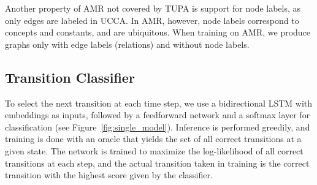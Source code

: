 \documentclass[11pt,a4paper]{article}
\begin{document}
Another property of AMR not covered by TUPA is support for node labels, 
as only edges are labeled in UCCA. In AMR, however, node labels correspond 
to concepts and constants, and are ubiquitous.
When training on AMR, we produce graphs only with edge labels (relations) 
and without node labels.


\subsection{Transition Classifier}\label{sec:classifier}

To select the next transition at each time step,
we use a bidirectional LSTM with embeddings as inputs,
followed by a feedforward network and a softmax layer for classification 
(see Figure~\ref{fig:single_model}).
Inference is performed greedily,
and training is done with an oracle that yields the set of all correct 
transitions at a given state.
The network is trained to maximize the log-likelihood of all correct transitions at
each step, and the actual transition taken in training is the correct transition
with the highest score given by the classifier.
\end{document}

